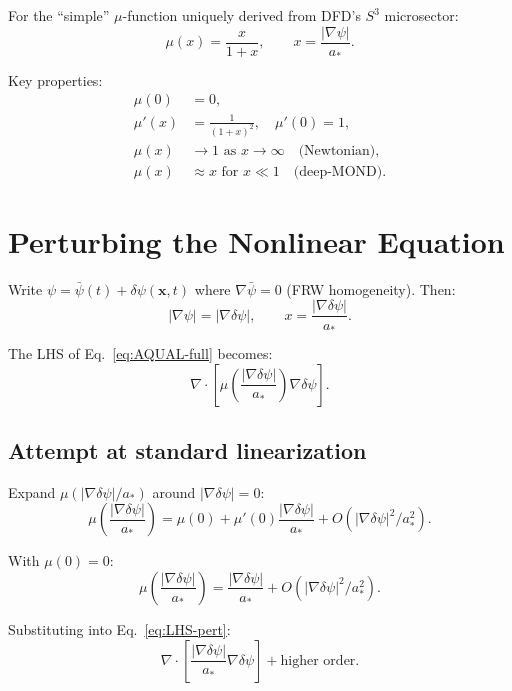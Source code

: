 \documentclass[11pt]{article}
\newcommand{\dpsi}{\delta\psi}
\newcommand{\astar}{a_*}
\begin{document}
For the ``simple'' $\mu$-function uniquely derived from DFD's $S^3$
microsector:
\begin{equation}
\mu(x) = \frac{x}{1+x}, \qquad x = \frac{|\nabla\psi|}{\astar}.
\label{eq:mu-simple}
\end{equation}

Key properties:
\begin{align}
\mu(0) &= 0, \label{eq:mu-at-zero}\\
\mu'(x) &= \frac{1}{(1+x)^2}, \quad \mu'(0) = 1, \\
\mu(x) &\to 1 \text{ as } x \to \infty \quad \text{(Newtonian)}, \\
\mu(x) &\approx x \text{ for } x \ll 1 \quad \text{(deep-MOND)}.
\end{align}


\section{Perturbing the Nonlinear Equation}

Write $\psi = \bar\psi(t) + \dpsi(\mathbf{x}, t)$ where
$\nabla\bar\psi = 0$ (FRW homogeneity). Then:
\begin{equation}
|\nabla\psi| = |\nabla\dpsi|, \qquad
x = \frac{|\nabla\dpsi|}{\astar}.
\end{equation}

The LHS of Eq.~\eqref{eq:AQUAL-full} becomes:
\begin{equation}
\nabla\cdot\left[\mu\!\left(\frac{|\nabla\dpsi|}{\astar}\right)
\nabla\dpsi\right].
\label{eq:LHS-pert}
\end{equation}

\subsection{Attempt at standard linearization}

Expand $\mu(|\nabla\dpsi|/\astar)$ around $|\nabla\dpsi| = 0$:
\begin{equation}
\mu\!\left(\frac{|\nabla\dpsi|}{\astar}\right)
= \mu(0) + \mu'(0)\frac{|\nabla\dpsi|}{\astar} + O(|\nabla\dpsi|^2/\astar^2).
\end{equation}

With $\mu(0) = 0$:
\begin{equation}
\mu\!\left(\frac{|\nabla\dpsi|}{\astar}\right)
= \frac{|\nabla\dpsi|}{\astar} + O(|\nabla\dpsi|^2/\astar^2).
\label{eq:mu-expand}
\end{equation}

Substituting into Eq.~\eqref{eq:LHS-pert}:
\begin{equation}
\nabla\cdot\left[\frac{|\nabla\dpsi|}{\astar}\nabla\dpsi\right]
+ \text{higher order}.
\label{eq:LHS-leading}
\end{equation}
\end{document}
